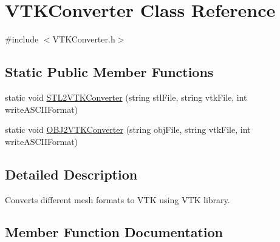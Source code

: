 \hypertarget{class_v_t_k_converter}{}\section{V\+T\+K\+Converter Class Reference}
\label{class_v_t_k_converter}


{\ttfamily \#include $<$V\+T\+K\+Converter.\+h$>$}

\subsection*{Static Public Member Functions}
\begin{DoxyCompactItemize}
\item 
static void \hyperlink{class_v_t_k_converter_aa3df2fb65ae80ec1ef476d9e00460cc6}{S\+T\+L2\+V\+T\+K\+Converter} (string stl\+File, string vtk\+File, int write\+A\+S\+C\+I\+I\+Format)
\item 
static void \hyperlink{class_v_t_k_converter_a060d99d6e878c421693ca47c73ecdcfc}{O\+B\+J2\+V\+T\+K\+Converter} (string obj\+File, string vtk\+File, int write\+A\+S\+C\+I\+I\+Format)
\end{DoxyCompactItemize}


\subsection{Detailed Description}
Converts different mesh formats to V\+TK using V\+TK library. 

\subsection{Member Function Documentation}
